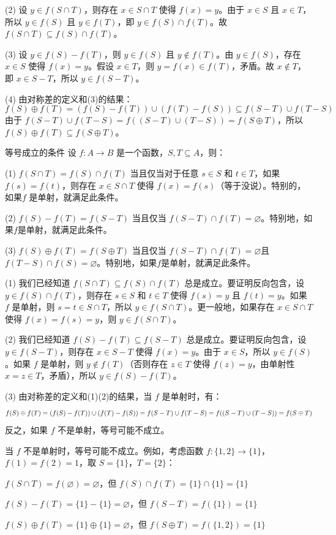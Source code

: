 \documentclass[lang=cn,11pt]{elegantbook}
\begin{document}
(2) 设 $y \in f(S \cap T)$，则存在 $x \in S \cap T$ 使得 $f(x) = y$。由于 $x \in S$ 且 $x \in T$，所以 $y \in f(S)$ 且 $y \in f(T)$，即 $y \in f(S) \cap f(T)$。故 $f(S \cap T) \subseteq f(S) \cap f(T)$。

(3) 设 $y \in f(S) - f(T)$，则 $y \in f(S)$ 且 $y \notin f(T)$。由 $y \in f(S)$，存在 $x \in S$ 使得 $f(x) = y$。假设 $x \in T$，则 $y = f(x) \in f(T)$，矛盾。故 $x \notin T$，即 $x \in S - T$，所以 $y \in f(S - T)$。

(4) 由对称差的定义和(3)的结果：
\[
f(S) \oplus f(T) = (f(S) - f(T)) \cup (f(T) - f(S)) \subseteq f(S - T) \cup f(T - S)
\]
由于 $f(S - T) \cup f(T - S) = f((S - T) \cup (T - S)) = f(S \oplus T)$，所以 $f(S) \oplus f(T) \subseteq f(S \oplus T)$。
\begin{theorem}{等号成立的条件}
设 $f: A \to B$ 是一个函数，$S, T \subseteq A$，则：

(1) $f(S \cap T) = f(S) \cap f(T)$ 当且仅当对于任意 $s \in S$ 和 $t \in T$，如果 $f(s) = f(t)$，则存在 $x \in S \cap T$ 使得 $f(x) = f(s)$（等于没说）。特别的，如果$f$ 是单射，就满足此条件。

(2) $f(S) - f(T) = f(S - T)$ 当且仅当 $f(S-T)\cap f(T)=\varnothing$。特别地，如果$f$是单射，就满足此条件。

(3) $f(S) \oplus f(T) = f(S \oplus T)$ 当且仅当 $f(S-T)\cap f(T)=\varnothing$且$f(T-S)\cap f(S)=\varnothing$。特别地，如果$f$是单射，就满足此条件。
\end{theorem}
(1) 我们已经知道 $f(S \cap T) \subseteq f(S) \cap f(T)$ 总是成立。要证明反向包含，设 $y \in f(S) \cap f(T)$，则存在 $s \in S$ 和 $t \in T$ 使得 $f(s) = y$ 且 $f(t) = y$。如果 $f$ 是单射，则 $s = t \in S \cap T$，所以 $y \in f(S \cap T)$。更一般地，如果存在 $x \in S \cap T$ 使得 $f(x) = f(s) = y$，则 $y \in f(S \cap T)$。

(2) 我们已经知道 $f(S) - f(T) \subseteq f(S - T)$ 总是成立。要证明反向包含，设 $y \in f(S - T)$，则存在 $x \in S - T$ 使得 $f(x) = y$。由于 $x \in S$，所以 $y \in f(S)$。如果 $f$ 是单射，则 $y \notin f(T)$（否则存在 $z \in T$ 使得 $f(z) = y$，由单射性 $x = z \in T$，矛盾），所以 $y \in f(S) - f(T)$。

(3) 由对称差的定义和(1)(2)的结果，当 $f$ 是单射时，有：\vspace{-10pt}
\[
f(S) \oplus f(T) = (f(S) - f(T)) \cup (f(T) - f(S)) = f(S - T) \cup f(T - S) = f((S - T) \cup (T - S)) = f(S \oplus T)\vspace{-10pt}
\]
反之，如果 $f$ 不是单射，等号可能不成立。

\begin{remark}
当 $f$ 不是单射时，等号可能不成立。例如，考虑函数 $f: \{1,2\} \to \{1\}$，$f(1) = f(2) = 1$，取 $S = \{1\}$，$T = \{2\}$：

$f(S \cap T) = f(\varnothing) = \varnothing$，但 $f(S) \cap f(T) = \{1\} \cap \{1\} = \{1\}$

$f(S) - f(T) = \{1\} - \{1\} = \varnothing$，但 $f(S - T) = f(\{1\}) = \{1\}$

$f(S) \oplus f(T) = \{1\} \oplus \{1\} = \varnothing$，但 $f(S \oplus T) = f(\{1,2\}) = \{1\}$
\end{remark}
\end{document}
